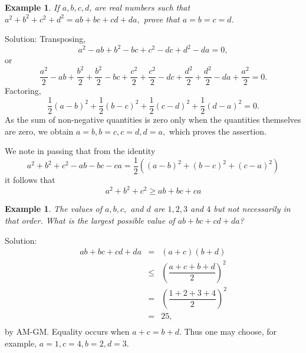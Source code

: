 \documentclass[11pt, openany]{book}
\theoremstyle{change} \theoremheaderfont{\blue\sffamily\bfseries}
\newtheorem{exa}[thm]{Example}
\theoremstyle{nonumberplain} \theoremheaderfont{\sffamily\bfseries}
\newcommand{\í}{\'{\i}}
\begin{document}
\begin{exa}
If $a, b, c, d$, are real numbers such that $a^2 + b^2 + c^2 + d^2 =
ab + bc + cd + da,$ prove that $a = b = c = d$.
\end{exa}Solution: Transposing,
$$a^2 - ab + b^2 - bc + c^2 - dc + d^2 - da  = 0,$$or
$$\frac{a^2}{2} - ab + \frac{b^2}{2}  + \frac{b^2}{2} - bc +
\frac{c^2}{2} + \frac{c^2}{2}  - dc + \frac{d^2}{2} +
\frac{d^2}{2} - da + \frac{a^2}{2}  = 0.$$ Factoring,
$$\frac{1}{2}(a - b)^2 + \frac{1}{2}(b - c)^2 +\frac{1}{2}(c - d)^2 +\frac{1}{2}(d - a)^2 = 0.$$
As the sum of non-negative quantities is zero only when the
quantities themselves are zero, we obtain $a = b, b = c, c = d, d
= a,$ which proves the assertion.




We note in passing that from the identity
\begin{equation}
a^2 + b^2 + c^2 - ab - bc - ca = \frac{1}{2}\left((a - b)^2 + (b -
c)^2 + (c - a)^2\right)
\end{equation}
it follows that
\begin{equation}
a^2 + b^2 + c^2  \geq ab + bc + ca
\end{equation}

\begin{exa}
The values of $a, b, c,$ and $d$ are $1, 2, 3$ and $4$ but not
necessarily in that order. What is the largest possible value of
$ab + bc + cd + da$?
\end{exa}
Solution: $$ \begin{array}{lll} ab + bc + cd + da & = & (a + c)(b
+ d) \\
& \leq & \left(\dfrac{a + c + b + d}{2}\right)^2 \\
& = & \left(\dfrac{1 + 2 + 3 + 4}{2}\right)^2 \\
& = & 25,\\
\end{array}$$ by AM-GM. Equality occurs when $a + c = b + d$. Thus one
may choose, for example, $a = 1, c = 4, b = 2, d = 3.$
\end{document}
